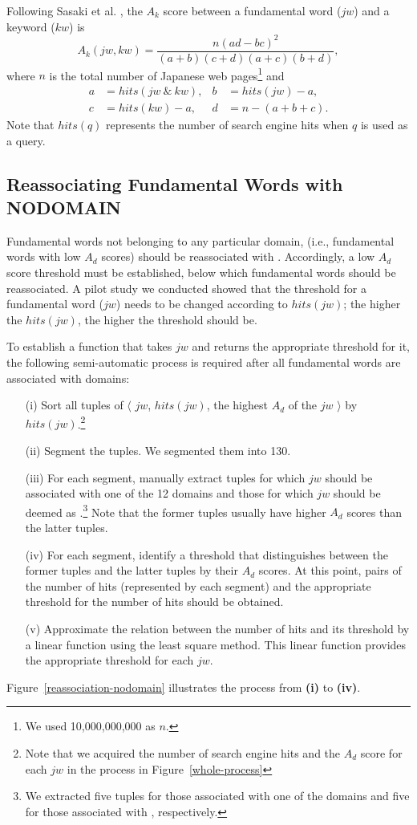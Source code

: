 \documentclass[english]{jnlp_1.4_rep}
\newcommand{\dom}[1]{}
\newcommand{\bangou}[1]{}
\begin{document}
Following Sasaki et al. \citeyear{Sasaki:Sato:Utsuro:2006}, 
the $A_k$ score between a fundamental word ($jw$) and a keyword ($kw$) is
\[
A_k(jw,kw)=\frac{n(ad-bc)^{2}}{(a+b)(c+d)(a+c)(b+d)} ,
\]
where $n$ is the total number of Japanese web pages\footnote{
We used 10,000,000,000 as $n$.} and
\begin{align*}
  a & = hits(jw\ \&\ kw), & b & = hits(jw) - a, \\
  c & = hits(kw) - a, & d & = n - (a + b + c). 
\end{align*}
Note that $hits(q)$ represents the number of search engine hits when $q$
is used as a query. 


\subsection{Reassociating Fundamental Words with NODOMAIN}
\label{nodomain}

Fundamental words not belonging to any particular domain, (i.e.,
fundamental words with low $A_d$ scores)
should be reassociated with \dom{nodomain}.
Accordingly, a low $A_d$ score threshold must be established,
below which fundamental words should be reassociated.
A pilot study we conducted showed that the threshold for a fundamental
word ($jw$)
needs to be changed according to $hits(jw)$;
the higher the $hits(jw)$, the higher the threshold should be.

To establish a function that takes $jw$ and returns the appropriate
threshold for it, the following semi-automatic process
is required after
all fundamental words are associated with domains:
\begin{itemize}
 \item[(i)]  Sort all tuples of $\langle$ $jw$, $hits(jw)$,
the highest $A_d$ of the $jw$ $\rangle$ by $hits(jw)$.\footnote{
Note that we acquired the number of search engine hits and the $A_d$
score for each $jw$ 
in the process \bangou{2} in Figure~\ref{whole-process}
}
 \item[(ii)] Segment the tuples.
We segmented them into 130.
 \item[(iii)] For each segment, manually extract tuples 
for which $jw$ should be associated with one of the 12 domains and those
for which $jw$
should be deemed as \dom{nodomain}.\footnote{
We extracted five tuples for those associated with one of the domains
and five for those associated with \dom{nodomain}, respectively.}
Note that the former tuples usually have higher $A_d$ scores than the
latter tuples.
 \item[(iv)] For each segment, identify a threshold that 
distinguishes
between the former tuples and the latter tuples by their $A_d$ scores.
\pagebreak
At this point, pairs of the number of hits (represented by each segment)
and the appropriate threshold for the number of hits should be obtained.
 \item[(v)] Approximate the relation between the number of hits and
its threshold by a linear function using the least square method.
This linear function provides the appropriate threshold for
each $jw$. 
\end{itemize}
Figure~\ref{reassociation-nodomain} illustrates the process from
\textbf{(i)} to \textbf{(iv)}.
\end{document}
